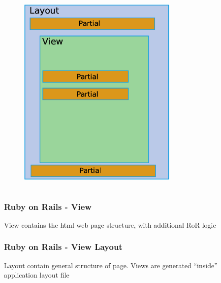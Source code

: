\documentclass{beamer}
\theoremstyle{mystyle}
\begin{document}
\begin{frame}
\begin{columns}
    \begin{column}{0.5\textwidth}
      \begin{figure}[h]
        \centering 
        \includegraphics[width = 0.7\textwidth]{./Layout_view_partial.eps}
      \end{figure}
    \end{column}
  \end{columns}
  
\end{frame}

\begin{frame}
  \frametitle{Ruby on Rails - View}
  \begin{definition}
    View contains the html web page structure, with additional RoR logic
  \end{definition}
  \begin{example}
    \viewexample
  \end{example}
\end{frame}

\begin{frame}
  \frametitle{Ruby on Rails - View Layout}
  \begin{definition}
    Layout contain general structure of page. 
    Views are generated ``inside'' application layout file
  \end{definition}
  \begin{example}
    \viewexample
  \end{example}
\end{frame}
\end{document}
